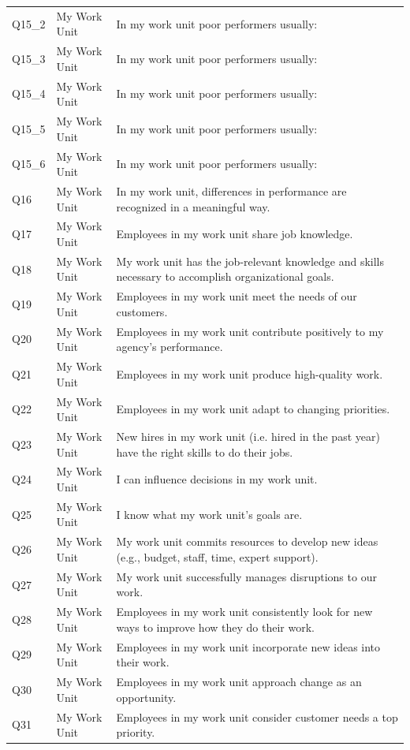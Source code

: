 \documentclass[
  man]{apa7}
\newenvironment{lltable}{\begin{landscape}\centering\begin{ThreePartTable}}{\end{ThreePartTable}\end{landscape}}
\begin{document}
\begin{lltable}
{\begin{longtable}{lll}
Q15\_2 & My Work Unit & In my work unit poor performers usually:\\
Q15\_3 & My Work Unit & In my work unit poor performers usually:\\
Q15\_4 & My Work Unit & In my work unit poor performers usually:\\
Q15\_5 & My Work Unit & In my work unit poor performers usually:\\
Q15\_6 & My Work Unit & In my work unit poor performers usually:\\
Q16 & My Work Unit & In my work unit, differences in performance are recognized in a meaningful way.\\
Q17 & My Work Unit & Employees in my work unit share job knowledge.\\
Q18 & My Work Unit & My work unit has the job-relevant knowledge and skills necessary to accomplish organizational goals.\\
Q19 & My Work Unit & Employees in my work unit meet the needs of our customers.\\
Q20 & My Work Unit & Employees in my work unit contribute positively to my agency's performance.\\
Q21 & My Work Unit & Employees in my work unit produce high-quality work.\\
Q22 & My Work Unit & Employees in my work unit adapt to changing priorities.\\
Q23 & My Work Unit & New hires in my work unit (i.e. hired in the past year) have the right skills to do their jobs.\\
Q24 & My Work Unit & I can influence decisions in my work unit.\\
Q25 & My Work Unit & I know what my work unit’s goals are.\\
Q26 & My Work Unit & My work unit commits resources to develop new ideas (e.g., budget, staff, time, expert support).\\
Q27 & My Work Unit & My work unit successfully manages disruptions to our work.\\
Q28 & My Work Unit & Employees in my work unit consistently look for new ways to improve how they do their work.\\
Q29 & My Work Unit & Employees in my work unit incorporate new ideas into their work.\\
Q30 & My Work Unit & Employees in my work unit approach change as an opportunity.\\
Q31 & My Work Unit & Employees in my work unit consider customer needs a top priority.\\

\end{longtable}}
\end{lltable}
\end{document}
